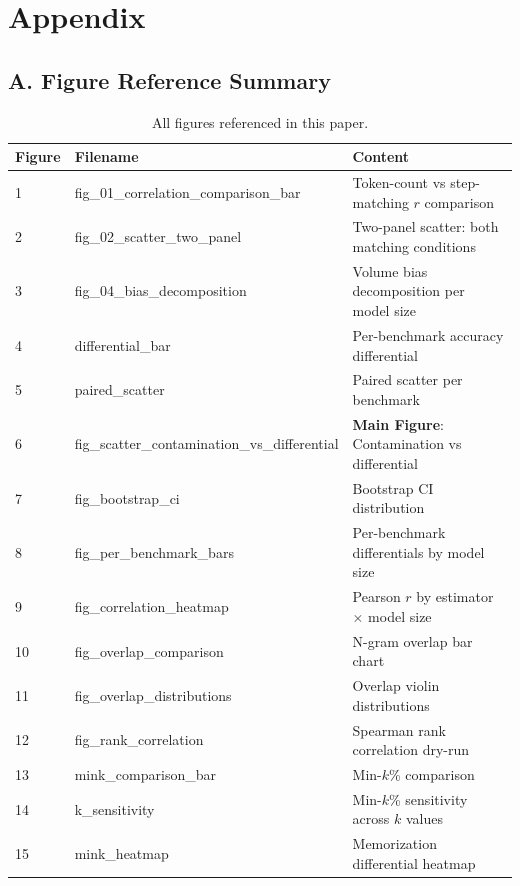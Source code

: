 
\section*{Appendix}

\subsection*{A. Figure Reference Summary}

\begin{table}[h]
\centering
\caption{All figures referenced in this paper.}
\label{tab:figure_reference}
\begin{tabular}{llp{6cm}}
\toprule
Figure & Filename & Content \\
\midrule
1 & fig\_01\_correlation\_comparison\_bar & Token-count vs step-matching $r$ comparison \\
2 & fig\_02\_scatter\_two\_panel & Two-panel scatter: both matching conditions \\
3 & fig\_04\_bias\_decomposition & Volume bias decomposition per model size \\
4 & differential\_bar & Per-benchmark accuracy differential \\
5 & paired\_scatter & Paired scatter per benchmark \\
6 & fig\_scatter\_contamination\_vs\_differential & \textbf{Main Figure}: Contamination vs differential \\
7 & fig\_bootstrap\_ci & Bootstrap CI distribution \\
8 & fig\_per\_benchmark\_bars & Per-benchmark differentials by model size \\
9 & fig\_correlation\_heatmap & Pearson $r$ by estimator $\times$ model size \\
10 & fig\_overlap\_comparison & N-gram overlap bar chart \\
11 & fig\_overlap\_distributions & Overlap violin distributions \\
12 & fig\_rank\_correlation & Spearman rank correlation dry-run \\
13 & mink\_comparison\_bar & Min-$k$\% comparison \\
14 & k\_sensitivity & Min-$k$\% sensitivity across $k$ values \\
15 & mink\_heatmap & Memorization differential heatmap \\
\bottomrule
\end{tabular}
\end{table}

